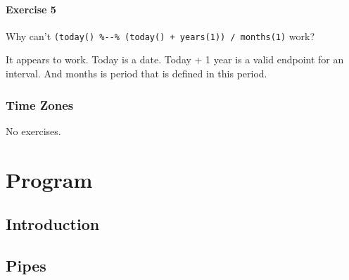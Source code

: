 \documentclass[]{book}
\newenvironment{Shaded}{\begin{snugshade}}{\end{snugshade}}
\newcommand{\CommentTok}[1]{\textcolor[rgb]{0.56,0.35,0.01}{\textit{#1}}}
\newcommand{\DecValTok}[1]{\textcolor[rgb]{0.00,0.00,0.81}{#1}}
\newcommand{\KeywordTok}[1]{\textcolor[rgb]{0.13,0.29,0.53}{\textbf{#1}}}
\newcommand{\NormalTok}[1]{#1}
\newcommand{\OperatorTok}[1]{\textcolor[rgb]{0.81,0.36,0.00}{\textbf{#1}}}
\newcommand{\StringTok}[1]{\textcolor[rgb]{0.31,0.60,0.02}{#1}}
\theoremstyle{definition}
\theoremstyle{definition}
\theoremstyle{definition}
\theoremstyle{remark}
\begin{document}
\hypertarget{exercise-5-12}{%
\subsection{Exercise 5}\label{exercise-5-12}}

Why can't
\texttt{(today()\ \%-\/-\%\ (today()\ +\ years(1))\ /\ months(1)} work?

It appears to work. Today is a date. Today + 1 year is a valid endpoint
for an interval. And months is period that is defined in this period.

\begin{Shaded}
\end{Shaded}

\hypertarget{time-zones}{%
\section{Time Zones}\label{time-zones}}

No exercises.

\hypertarget{part-program}{%
\part{Program}\label{part-program}}

\hypertarget{program-intro}{%
\chapter{Introduction}\label{program-intro}}

\hypertarget{pipes}{%
\chapter{Pipes}\label{pipes}}
\end{document}
